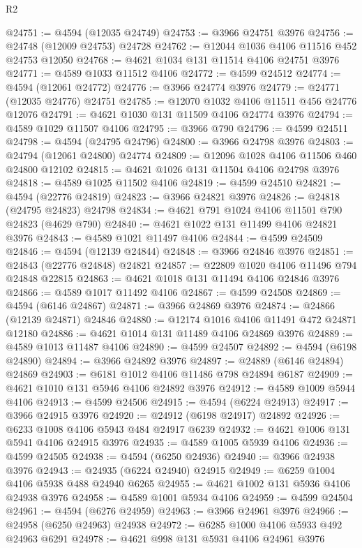 \begin{lexlean}{R2}
\begin{coremodule}
@24751 := @4594 (@12035 @24749)
@24753 := @3966 @24751 @3976
@24756 := @24748 (@12009 @24753) @24728
@24762 := @12044 @1036 @4106 @11516 @452 @24753 @12050
@24768 := @4621 @1034 @131 @11514 @4106 @24751 @3976
@24771 := @4589 @1033 @11512 @4106
@24772 := @4599 @24512
@24774 := @4594 (@12061 @24772)
@24776 := @3966 @24774 @3976
@24779 := @24771 (@12035 @24776) @24751
@24785 := @12070 @1032 @4106 @11511 @456 @24776 @12076
@24791 := @4621 @1030 @131 @11509 @4106 @24774 @3976
@24794 := @4589 @1029 @11507 @4106
@24795 := @3966 @790
@24796 := @4599 @24511
@24798 := @4594 (@24795 @24796)
@24800 := @3966 @24798 @3976
@24803 := @24794 (@12061 @24800) @24774
@24809 := @12096 @1028 @4106 @11506 @460 @24800 @12102
@24815 := @4621 @1026 @131 @11504 @4106 @24798 @3976
@24818 := @4589 @1025 @11502 @4106
@24819 := @4599 @24510
@24821 := @4594 (@22776 @24819)
@24823 := @3966 @24821 @3976
@24826 := @24818 (@24795 @24823) @24798
@24834 := @4621 @791 @1024 @4106 @11501 @790 @24823 (@4629 @790)
@24840 := @4621 @1022 @131 @11499 @4106 @24821 @3976
@24843 := @4589 @1021 @11497 @4106
@24844 := @4599 @24509
@24846 := @4594 (@12139 @24844)
@24848 := @3966 @24846 @3976
@24851 := @24843 (@22776 @24848) @24821
@24857 := @22809 @1020 @4106 @11496 @794 @24848 @22815
@24863 := @4621 @1018 @131 @11494 @4106 @24846 @3976
@24866 := @4589 @1017 @11492 @4106
@24867 := @4599 @24508
@24869 := @4594 (@6146 @24867)
@24871 := @3966 @24869 @3976
@24874 := @24866 (@12139 @24871) @24846
@24880 := @12174 @1016 @4106 @11491 @472 @24871 @12180
@24886 := @4621 @1014 @131 @11489 @4106 @24869 @3976
@24889 := @4589 @1013 @11487 @4106
@24890 := @4599 @24507
@24892 := @4594 (@6198 @24890)
@24894 := @3966 @24892 @3976
@24897 := @24889 (@6146 @24894) @24869
@24903 := @6181 @1012 @4106 @11486 @798 @24894 @6187
@24909 := @4621 @1010 @131 @5946 @4106 @24892 @3976
@24912 := @4589 @1009 @5944 @4106
@24913 := @4599 @24506
@24915 := @4594 (@6224 @24913)
@24917 := @3966 @24915 @3976
@24920 := @24912 (@6198 @24917) @24892
@24926 := @6233 @1008 @4106 @5943 @484 @24917 @6239
@24932 := @4621 @1006 @131 @5941 @4106 @24915 @3976
@24935 := @4589 @1005 @5939 @4106
@24936 := @4599 @24505
@24938 := @4594 (@6250 @24936)
@24940 := @3966 @24938 @3976
@24943 := @24935 (@6224 @24940) @24915
@24949 := @6259 @1004 @4106 @5938 @488 @24940 @6265
@24955 := @4621 @1002 @131 @5936 @4106 @24938 @3976
@24958 := @4589 @1001 @5934 @4106
@24959 := @4599 @24504
@24961 := @4594 (@6276 @24959)
@24963 := @3966 @24961 @3976
@24966 := @24958 (@6250 @24963) @24938
@24972 := @6285 @1000 @4106 @5933 @492 @24963 @6291
@24978 := @4621 @998 @131 @5931 @4106 @24961 @3976

\end{coremodule}
\end{lexlean}
